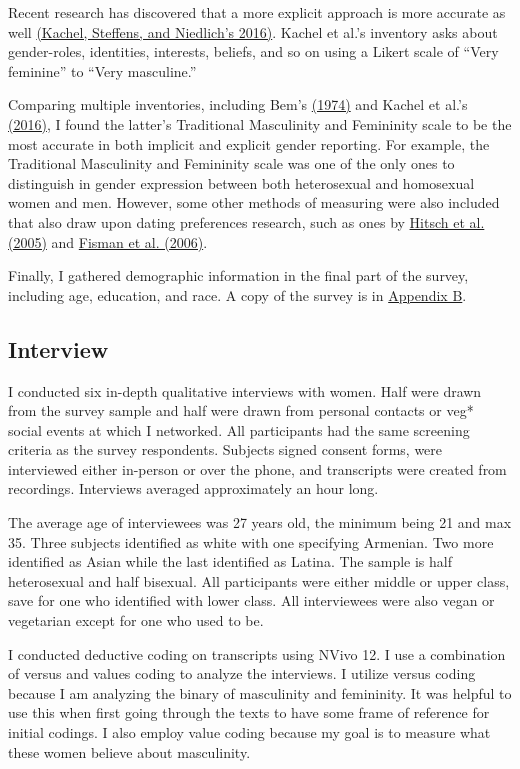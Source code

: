 \documentclass[twoside]{report}
\begin{document}
\begin{multicols*}{2}
Recent research has discovered that a more explicit approach is more accurate as well \hyperlink{kachel}{(Kachel, Steffens, and Niedlich's 2016)}. Kachel et al.'s inventory asks about gender-roles, identities, interests, beliefs, and so on using a Likert scale of ``Very feminine'' to ``Very masculine.'' 

Comparing multiple inventories, including Bem's \hyperlink{bem}{(1974)} and Kachel et al.'s \hyperlink{kachel}{(2016)}, I found the latter's
Traditional Masculinity and Femininity scale to be the most accurate in
both implicit and explicit gender reporting. For example, the Traditional Masculinity and Femininity scale was one of the only ones to distinguish in gender expression between both heterosexual and homosexual women and men. However, some other methods of measuring were also included that also draw upon dating preferences research, such as ones by \hyperlink{hitsch1}{Hitsch et al. (2005)} and \hyperlink{fisman}{Fisman et al. (2006)}. 

Finally, I gathered demographic information in the final part of the survey, including age, education, and race. A copy of the survey is in  \hyperlink{appendix-b}{Appendix B}.

\subsection{Interview}

I conducted six in-depth qualitative interviews with women. Half were drawn from the survey sample and half were drawn from personal contacts or veg* social events at which I networked. All participants had the same screening criteria as the survey respondents. Subjects signed consent forms, were interviewed either in-person or over the phone, and transcripts were created from recordings. Interviews averaged approximately an hour long.

The average age of interviewees was 27 years old, the minimum being 21 and max 35. Three subjects identified as white with one specifying Armenian. Two more
identified as Asian while the last identified as Latina. The sample is
half heterosexual and half bisexual. All participants were either middle
or upper class, save for one who identified with lower class. All
interviewees were also vegan or vegetarian except for one who used to be.

I conducted deductive coding on transcripts using NVivo 12. I use a
combination of versus and values coding to analyze the interviews. I
utilize versus coding because I am analyzing the binary of masculinity
and femininity. It was helpful to use this when first going through the
texts to have some frame of reference for initial codings. I also employ
value coding because my goal is to measure what these women believe
about masculinity. 


\end{multicols*}
\end{document}
